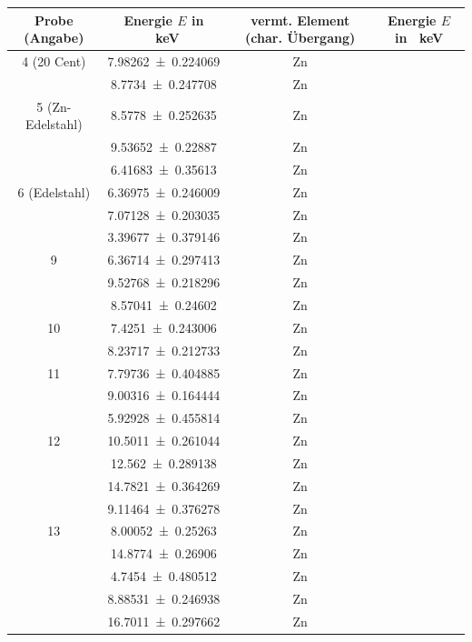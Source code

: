 \documentclass[
	a4paper,
	12pt,
	pagesize,
	ngerman
]{scrartcl}
\begin{document}
	\begin{table}[H]
		\centering
		\begin{tabular}{ c | c || c | c }
			Probe (Angabe)&Energie $E$ in \SI{}{keV} & vermt. Element (char. Übergang) &  Energie $E$ in \SI{}{keV} \\ \hline \hline					
			
			4 (20 Cent)& \SI{7.98262+-0.224069}{} &Zn &  \SI{}{} \\
			& \SI{8.7734+-0.247708}{} &Zn &  \SI{}{} \\ \hline
			
			5 (Zn-Edelstahl)& \SI{8.5778+-0.252635}{} &Zn &  \SI{}{} \\
			& \SI{9.53652+-0.22887}{} &Zn &  \SI{}{} \\
			& \SI{6.41683+-0.35613}{} &Zn &  \SI{}{} \\ \hline
			
			6 (Edelstahl)& \SI{6.36975+-0.246009}{} &Zn &  \SI{}{} \\
			& \SI{7.07128+-0.203035}{} &Zn &  \SI{}{} \\
			& \SI{3.39677+-0.379146}{} &Zn &  \SI{}{} \\ \hline
			
			9 & \SI{6.36714+-0.297413}{} &Zn &  \SI{}{} \\
			& \SI{9.52768+-0.218296}{} &Zn &  \SI{}{} \\
			& \SI{8.57041+-0.24602}{} &Zn &  \SI{}{} \\ \hline
			
			10 & \SI{7.4251+-0.243006}{} &Zn &  \SI{}{} \\
			& \SI{8.23717+-0.212733}{} &Zn &  \SI{}{} \\ \hline
			
			11 & \SI{7.79736+-0.404885}{} &Zn &  \SI{}{} \\
			& \SI{9.00316+-0.164444}{} &Zn &  \SI{}{} \\
			& \SI{5.92928+-0.455814}{} &Zn &  \SI{}{} \\ \hline
			
			12 & \SI{10.5011+-0.261044}{} &Zn &  \SI{}{} \\
			& \SI{12.562+-0.289138}{} &Zn &  \SI{}{} \\
			& \SI{14.7821+-0.364269}{} &Zn &  \SI{}{} \\
			& \SI{9.11464+-0.376278}{} &Zn &  \SI{}{} \\ \hline
			
			13 & \SI{8.00052+-0.25263}{} &Zn &  \SI{}{} \\
			& \SI{14.8774+-0.26906}{} &Zn &  \SI{}{} \\
			& \SI{4.7454+-0.480512}{} &Zn &  \SI{}{} \\
			& \SI{8.88531+-0.246938}{} &Zn &  \SI{}{} \\
			& \SI{16.7011+-0.297662}{} &Zn &  \SI{}{} \\ \hline
			

\end{tabular}
\end{table}
\end{document}
